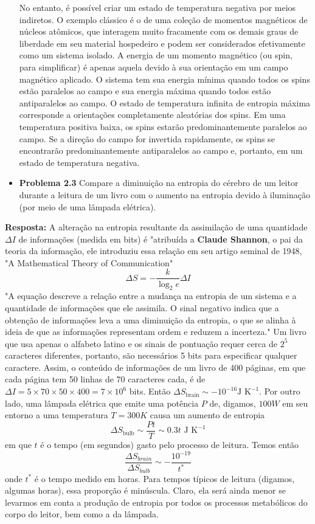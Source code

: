 \documentclass[12pt]{article}
\begin{document}
\begin{itemize}
No entanto, é possível criar um estado de temperatura negativa por meios indiretos. O exemplo clássico é o de uma coleção de momentos magnéticos de núcleos atômicos, que interagem muito fracamente com os demais graus de liberdade em seu material hospedeiro e podem ser considerados efetivamente como um sistema isolado. A energia de um momento magnético (ou spin, para simplificar) é apenas aquela devido à sua orientação em um campo magnético aplicado. O sistema tem sua energia mínima quando todos os spins estão paralelos ao campo e sua energia máxima quando todos estão antiparalelos ao campo. O estado de temperatura infinita de entropia máxima corresponde a orientações completamente aleatórias dos spins. Em uma temperatura positiva baixa, os spins estarão predominantemente paralelos ao campo. Se a direção do campo for invertida rapidamente, os spins se encontrarão predominantemente antiparalelos ao campo e, portanto, em um estado de temperatura negativa.
     
     \item \textbf{Problema 2.3} Compare a diminuição na entropia do cérebro de um leitor durante a leitura de um livro com o aumento na entropia devido à iluminação (por meio de uma lâmpada elétrica).
 \end{itemize}
\textbf{Resposta:} A alteração na entropia resultante da assimilação de uma quantidade $\Delta I$ de informações (medida em bits) é "atribuída a \textbf{Claude Shannon}, o pai da teoria da informação, ele introduziu essa relação em seu artigo seminal de 1948, "A Mathematical Theory of Communication"
\[
\Delta S = -\frac{k}{\log_{2} e} \Delta I
\]
"A equação descreve a relação entre a mudança na entropia de um sistema e a quantidade de informações que ele assimila. O sinal negativo indica que a obtenção de informações leva a uma diminuição da entropia, o que se alinha à ideia de que as informações representam ordem e reduzem a incerteza."
Um livro que usa apenas o alfabeto latino e os sinais de pontuação requer cerca de $2^5
$ caracteres diferentes, portanto, são necessários 5 bits para especificar qualquer caractere. Assim, o conteúdo de informações de um livro de 400 páginas, em que cada página tem 50 linhas de 70 caracteres cada, é de$\Delta I=5×70×50×400=7×10^6$ bits. Então $\Delta S_ \text{brain}∼−10^{−16}  \text{J K}^{−1}$. Por outro lado, uma lâmpada elétrica que emite uma potência $P$ de, digamos, $100 W$ em seu entorno a uma temperatura $ T=300 K$ causa um aumento de entropia 
\[
\Delta S_{\text{bulb}} \sim \frac{Pt}{T} \sim 0.3t \text{ J K}^{-1}
\]
em que $t$ é o tempo (em segundos) gasto pelo processo de leitura. Temos então
\[
\frac{\Delta S_{brain}}{\Delta S_{bulb}} \sim - \frac{10^{-19}}{t^*}
\]
onde $t^*$ é o tempo medido em horas. Para tempos típicos de leitura (digamos, algumas horas), essa proporção é minúscula. Claro, ela será ainda menor se levarmos em conta a produção de entropia por todos os processos metabólicos do corpo do leitor, bem como a da lâmpada. 
\end{document}
